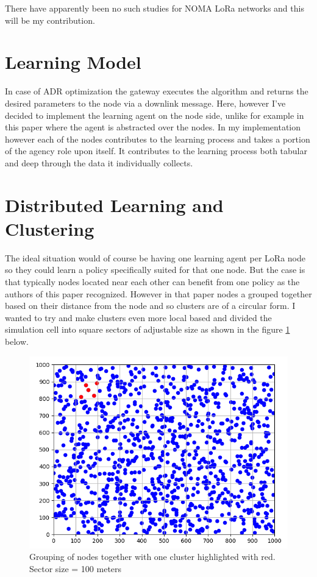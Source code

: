 There have apparently been no such studies for NOMA LoRa 
networks and this will be my contribution. 

\section{Learning Model}

In case of ADR optimization the gateway executes the algorithm
and returns the desired parameters to the node via a downlink 
message. Here, however I've decided to implement the learning 
agent on the node side, unlike for example in this paper 
\cite{rl_lora_sarsa_dqn} where the agent is abstracted over the
nodes. In my implementation however each of the nodes
contributes to the learning process and takes a portion of the
agency role upon itself. It contributes to the learning process
both tabular and deep through the data it individually collects.

\section{Distributed Learning and Clustering}
The ideal situation would of course be having one learning agent
per LoRa node so they could learn a policy specifically suited for that one node. But the case is that typically nodes located 
near each other can benefit from one policy as the authors of this paper \cite{rl_lora_original} recognized. However 
in that paper nodes a grouped together based on their 
distance from the node and so clusters are of a circular 
form. 
I wanted to try and make clusters even more local based and divided the simulation cell into 
square sectors of adjustable size as shown in the figure 
\ref{fig:my_sectors} below.

\begin{figure}[H]
\centering
\includegraphics[scale=0.7]{figures/my_sectors.PNG}
  \caption{Grouping of nodes together with one cluster highlighted with red. \\ Sector size = 100 meters}
  \label{fig:my_sectors}
\end{figure}

